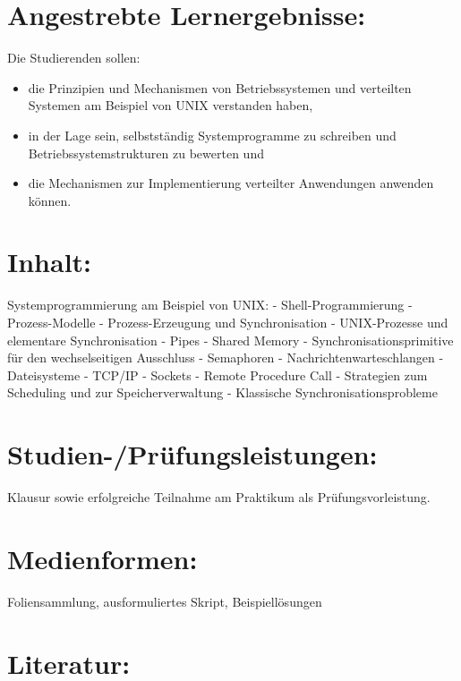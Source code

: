\section{Angestrebte
Lernergebnisse:}\label{angestrebte-lernergebnisse-5}

Die Studierenden sollen:

\begin{itemize}
\tightlist
\item
  die Prinzipien und Mechanismen von Betriebssystemen und verteilten
  Systemen am Beispiel von UNIX verstanden haben,
\item
  in der Lage sein, selbstständig Systemprogramme zu schreiben und
  Betriebssystemstrukturen zu bewerten und
\item
  die Mechanismen zur Implementierung verteilter Anwendungen anwenden
  können.
\end{itemize}

\section{Inhalt:}\label{inhalt-5}

Systemprogrammierung am Beispiel von UNIX: - Shell-Programmierung -
Prozess-Modelle - Prozess-Erzeugung und Synchronisation - UNIX-Prozesse
und elementare Synchronisation - Pipes - Shared Memory -
Synchronisationsprimitive für den wechselseitigen Ausschluss -
Semaphoren - Nachrichtenwarteschlangen - Dateisysteme - TCP/IP - Sockets
- Remote Procedure Call - Strategien zum Scheduling und zur
Speicherverwaltung - Klassische Synchronisationsprobleme

\section{Studien-/Prüfungsleistungen:}\label{studien-pruxfcfungsleistungen-5}

Klausur sowie erfolgreiche Teilnahme am Praktikum als
Prüfungsvorleistung.

\section{Medienformen:}\label{medienformen-5}

Foliensammlung, ausformuliertes Skript, Beispiellösungen

\section{Literatur:}\label{literatur-5}

